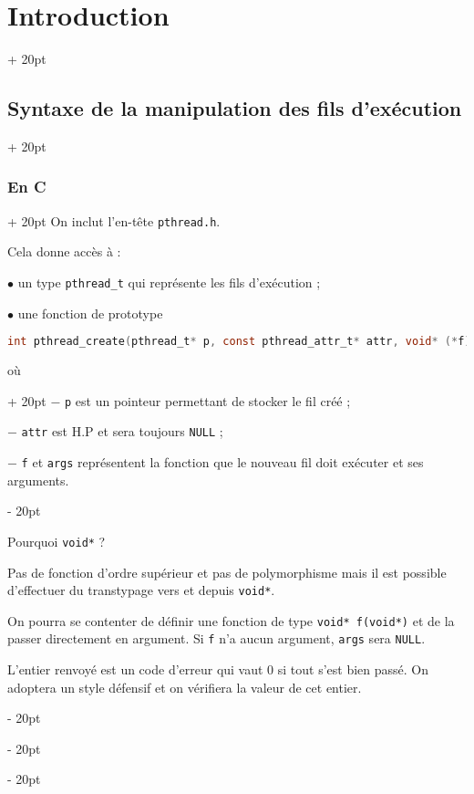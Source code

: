 \documentclass[a4paper, 12pt, twoside]{article}
\newcommand{\ind}[1][20pt]{\advance\leftskip + #1}
\newcommand{\deind}[1][20pt]{\advance\leftskip - #1}
\newenvironment{indt}[2][20pt]{#2 \par \ind[#1]}{\par \deind} %
\begin{document}
\begin{indt}{\section{Introduction}}
\begin{indt}{\subsection{Syntaxe de la manipulation des fils d'exécution}}
            \vspace{12pt}
            
            \begin{indt}{\subsubsection{En C}}
                On inclut l'en-tête \texttt{pthread.h}.

                Cela donne accès à :

                $\bullet$  un type \texttt{pthread\_t} qui représente les fils d'exécution ;

                $\bullet$ une fonction de prototype

                \begin{lstlisting}[language=C, xleftmargin=80pt]
int pthread_create(pthread_t* p, const pthread_attr_t* attr, void* (*f)(void*), void* args)\end{lstlisting}

                \begin{indt}{où}
                    $-$ \texttt p est un pointeur permettant de stocker le fil créé ;

                    $-$ \texttt{attr} est H.P et sera toujours \texttt{NULL} ;

                    $-$ \texttt f et \texttt{args} représentent la fonction que le nouveau fil doit exécuter et ses arguments.
                \end{indt}

                \vspace{12pt}
                
                Pourquoi \texttt{void*} ?

                Pas de fonction d'ordre supérieur et pas de polymorphisme mais il est possible d'effectuer du transtypage vers et depuis \texttt{void*}.

                On pourra se contenter de définir une fonction de type \texttt{void* f(void*)} et de la passer directement en argument.
                Si \texttt f n'a aucun argument, \texttt{args} sera \texttt{NULL}.

                L'entier renvoyé est un code d'erreur qui vaut 0 si tout s'est bien passé. On adoptera un style défensif et on vérifiera la valeur de cet entier.

                \vspace{12pt}
                

\end{indt}
\end{indt}
\end{indt}
\end{document}
